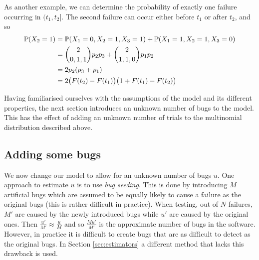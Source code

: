 As another example, we can determine the probability of exactly one failure occurring in $(t_1,t_2]$. The second failure can occur either before $t_1$ or after $t_2$, and so
\begin{align*}
    \mathbb{P}(X_2=1)&=\mathbb{P}(X_1=0, X_2=1,X_3=1)+\mathbb{P}(X_1=1,X_2=1, X_3=0)\\
    &={2\choose 0, 1, 1}p_2p_3+{2\choose 1,1,0}p_1p_2\\
    &=2p_2(p_3+p_1)\\
    &=2\big(F(t_2)-F(t_1)\big)\big(1+F(t_1)-F(t_2)\big)
\end{align*}

Having familiarised ourselves with the assumptions of the model and its different properties, the next section introduces an unknown number of bugs to the model. This has the effect of adding an unknown number of trials to the multinomial distribution described above.

\subsection{Adding some bugs}\label{sec:2.2}
We now change our model to allow for an unknown number of bugs $u$. One approach to estimate $u$ is to use \textit{bug seeding}. This is done by introducing $M$ artificial bugs which are assumed to be equally likely to cause a failure as the original bugs (this is rather difficult in practice). When testing, out of $N$ failures, $M'$ are caused by the newly introduced bugs while $u'$ are caused by the original ones. Then $\frac{u'}{M'}\approx \frac{u}{M}$ and so $\frac{Mu'}{M'}$ is the approximate number of bugs in the software. However, in practice it is difficult to create bugs that are as difficult to detect as the original bugs. In Section \ref{sec:estimators} a different method that lacks this drawback is used.

